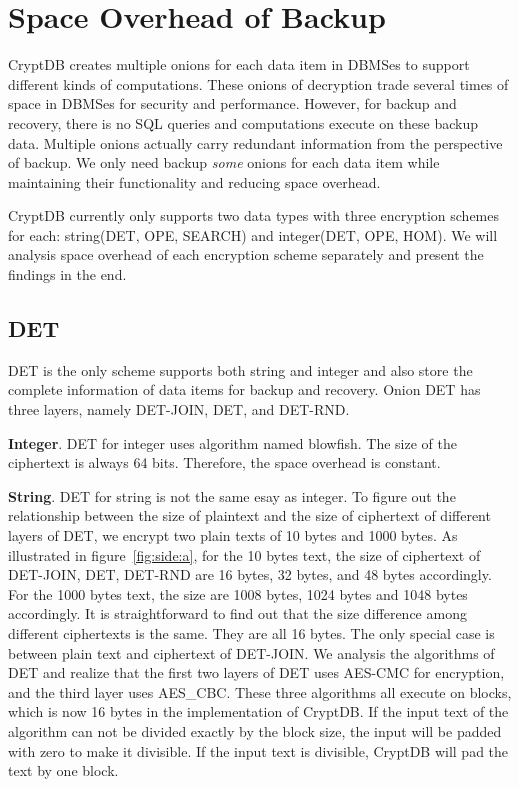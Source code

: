 \section{Space Overhead of Backup}

CryptDB creates multiple onions for each data item in DBMSes to support different kinds of computations. These onions of decryption trade several times of space in DBMSes for security and performance. However, for backup and recovery, there is no SQL queries and computations execute on these backup data. Multiple onions actually carry redundant information from the perspective of backup. We only need backup \textit{some} onions for each data item while maintaining their functionality and reducing space overhead. 


CryptDB currently only supports two data types with three encryption schemes for each: string(DET, OPE, SEARCH) and integer(DET, OPE, HOM). We will analysis space overhead of each encryption scheme separately and present the findings in the end.

\subsection{DET}
DET is the only scheme supports both string and integer and also store the complete information of data items for backup and recovery. Onion DET has three layers, namely DET-JOIN, DET, and DET-RND. 

\textbf{Integer}. DET for integer uses algorithm named blowfish. The size of the ciphertext is always 64 bits. Therefore, the space overhead is constant.

\textbf{String}. DET for string is not the same esay as integer. To figure out the relationship between the size of plaintext and the size of ciphertext of different layers of DET, we encrypt two plain texts of 10 bytes and 1000 bytes. As illustrated in figure~\ref{fig:side:a},  for the 10 bytes text, the size of ciphertext of DET-JOIN, DET, DET-RND are 16 bytes, 32 bytes, and 48 bytes accordingly. For the 1000 bytes text, the size are 1008 bytes, 1024 bytes and 1048 bytes accordingly. It is straightforward to find out that the size difference among different ciphertexts is the same. They are all 16 bytes. The only special case is between plain text and ciphertext of DET-JOIN. We analysis the algorithms of DET and realize that the first two layers of DET uses AES-CMC for encryption, and the third layer uses AES\_CBC. These three algorithms all execute on blocks, which is now 16 bytes in the implementation of CryptDB. If the input text of the algorithm can not be divided exactly by the block size, the input will be padded with zero to make it divisible. If the input text is divisible, CryptDB will pad the text by one block. 

